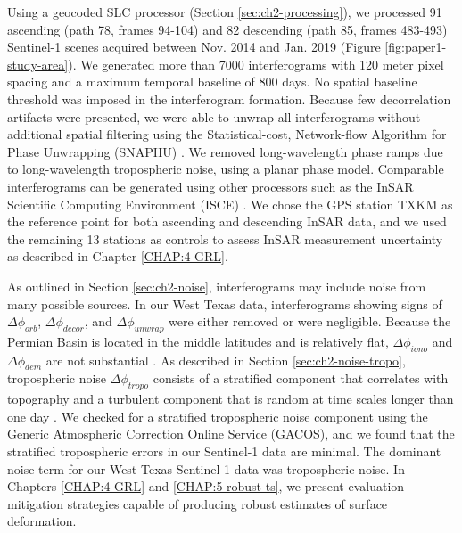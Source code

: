 Using a geocoded SLC processor \citep{Zheng2017PhaseCorrectionSingle, Zebker2017UserFriendlyInsar} (Section \ref{sec:ch2-processing}), we processed 91 ascending (path 78, frames 94-104) and 82 descending (path 85, frames 483-493) Sentinel-1 scenes acquired between Nov. 2014 and Jan. 2019 (Figure \ref{fig:paper1-study-area}). We generated more than 7000 interferograms with 120 meter pixel spacing and a maximum temporal baseline of 800 days. No spatial baseline threshold was imposed in the interferogram formation. Because few decorrelation artifacts were presented, we were able to unwrap all interferograms without additional spatial filtering using the Statistical-cost, Network-flow Algorithm for Phase Unwrapping (SNAPHU) \citep{Chen2001TwoDimensionalPhase}. We removed long-wavelength phase ramps due to long-wavelength tropospheric noise, using a planar phase model. Comparable interferograms can be generated using other processors such as the InSAR Scientific Computing Environment (ISCE) \citep{Rosen2012InsarScientificComputing}. 
We chose the GPS station TXKM as the reference point for both ascending and descending InSAR data, and we used the remaining 13 stations as controls to assess InSAR measurement uncertainty as described in Chapter \ref{CHAP:4-GRL}.

As outlined in Section \ref{sec:ch2-noise}, interferograms may include noise from many possible sources. %
In our West Texas data, interferograms showing signs of $\Delta \phi_{orb}$, $\Delta \phi_{decor}$, and $\Delta \phi_{unwrap}$ were either removed or were negligible. Because the Permian Basin is located in the middle latitudes and is relatively flat, $\Delta \phi_{iono}$ and $\Delta \phi_{dem}$  are not substantial \citep{Fattahi2013DemErrorCorrection, Liang2019IonosphericCorrectionInsar}. 
As described in Section \ref{sec:ch2-noise-tropo}, tropospheric noise $\Delta \phi_{tropo}$ consists of a stratified component that correlates with topography \citep{Doin2009CorrectionsStratifiedTropospheric} and a turbulent component that is random at time scales longer than one day \citep{Emardson2003NeutralAtmosphericDelay}. We checked for a stratified tropospheric noise component using the Generic Atmospheric Correction Online Service (GACOS), and we found that the stratified tropospheric errors in our Sentinel-1 data are minimal.
The dominant noise term for our West Texas Sentinel-1 data was tropospheric noise.
In Chapters \ref{CHAP:4-GRL} and \ref{CHAP:5-robust-ts}, we present evaluation mitigation strategies capable of producing robust estimates of surface deformation.

